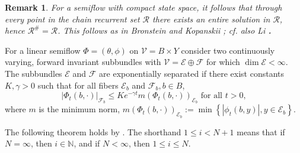 \documentclass{siamltex}%
\newtheorem{remark}[theorem]{Remark}
\begin{document}
\begin{remark}
For a semiflow with compact state space, it follows that through every point
in the chain recurrent set $\mathcal{R}$ there exists an entire solution in
$\mathcal{R}$, hence $\mathcal{R}^{\#}=\mathcal{R}$. This follows as in
Bronstein and Kopanskii \cite[Section 8]{BroK88}; cf. also Li
\cite[Proposition 2.5]{Li07}\textbf{.}
\end{remark}

For a linear semiflow $\Phi=(\theta,\phi)$ on $\mathcal{V}=B\times Y$ consider
two continuously varying, forward invariant subbundles with $\mathcal{V}%
=\mathcal{E}\oplus\mathcal{F}$ for which $\dim\mathcal{E}<\infty$. The
subbundles $\mathcal{E}$ and $\mathcal{F}$ are exponentially separated if
there exist constants $K,\gamma>0$ such that for all fibers $\mathcal{E}_{b}$
and $\mathcal{F}_{b},b\in B$,%
\[
\left\vert \Phi_{t}(b,\cdot)\right\vert _{\mathcal{F}_{b}}\leq Ke^{-\gamma
t}m(\Phi_{t}(b,\cdot))_{\mathcal{E}_{b}}\text{ for all }t>0,
\]
where $m$ is the minimum norm, $m(\Phi_{t}(b,\cdot))_{\mathcal{E}_{b}}%
:=\min\left\{  \left\vert \phi_{t}(b,y)\right\vert ,y\in\mathcal{E}%
_{b}\right\}  $.

The following theorem holds by \cite[Theorems A and B and Corollary
1.4]{BluL19}. The shorthand $1\leq i<N+1$ means that if $N=\infty$, then
$i\in\mathbb{N}$, and if $N<\infty$, then $1\leq i\leq N$.
\end{document}
